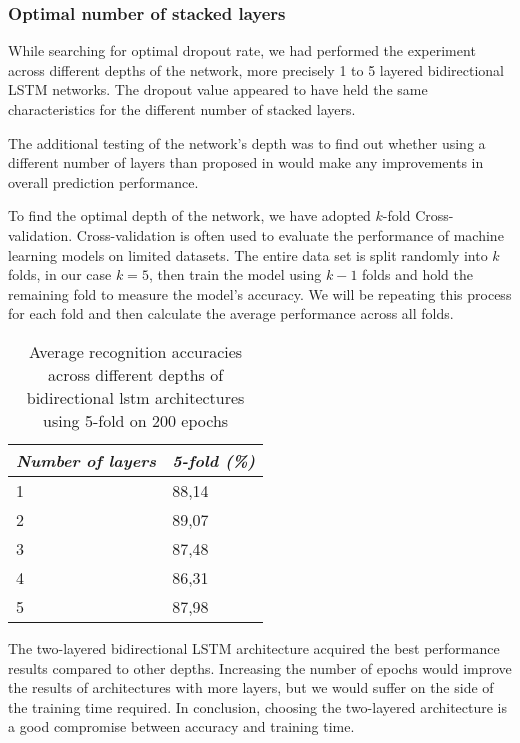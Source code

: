 \subsubsection{Optimal number of stacked layers}

While searching for optimal dropout rate, we had performed the experiment across different depths of the network, more precisely 1 to 5 layered bidirectional LSTM networks. The dropout value appeared to have held the same characteristics for the different number of stacked layers.

The additional testing of the network's depth was to find out whether using a different number of layers than proposed in \cite{bidirect_dynam} would make any improvements in overall prediction performance.

To find the optimal depth of the network, we have adopted $k$-fold Cross-validation. Cross-validation is often used to evaluate the performance of machine learning models on limited datasets. The entire data set is split randomly into $k$ folds, in our case $k=5$, then train the model using $k-1$ folds and hold the remaining fold to measure the model's accuracy. We will be repeating this process for each fold and then calculate the average performance across all folds.

\begin{table}[ht]
    \centering
    \caption{Average recognition accuracies across different depths of bidirectional lstm architectures using 5-fold on 200 epochs}
    \begin{tabular}{ | p{4.5cm}| p{4.5cm} |} 
        \hline
        \hfil \textit{Number of layers}
        & \hfil \textit{5-fold (\%)}\\
        \hline\hline
        \hfil 1 				& \hfil 88,14			\\
        \hline
        \hfil 2 				& \hfil 89,07		\\
        \hline
        \hfil 3 				& \hfil 87,48		\\
        \hline
        \hfil 4 				& \hfil 86,31		\\
        \hline
        \hfil 5 				& \hfil 87,98		\\
        \hline
    \end{tabular}
    \label{tab:HT_results_table}
\end{table}

The two-layered bidirectional LSTM architecture acquired the best performance results compared to other depths. Increasing the number of epochs would improve the results of architectures with more layers, but we would suffer on the side of the training time required. In conclusion, choosing the two-layered architecture is a good compromise between accuracy and training time.

